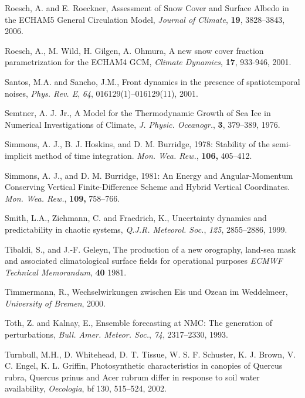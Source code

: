 \begin{thebibliography}{}
 Roesch, A. and E. Roeckner, Assessment of Snow Cover and Surface Albedo
 in the ECHAM5 General Circulation Model, {\it Journal of Climate},
 {\bf 19}, 3828--3843, 2006.

 Roesch, A., M. Wild, H. Gilgen, A. Ohmura, A new snow cover fraction
 parametrization for the ECHAM4 GCM,
 {\it Climate Dynamics}, {\bf 17}, 933-946, 2001.   

 Santos, M.A. and Sancho,
 J.M., Front dynamics in the presence of spatiotemporal noises,
 {\em Phys. Rev. E}, {\em 64}, 016129(1)--016129(11), 2001.

 Semtner, A. J. Jr.,
 A Model for the Thermodynamic Growth of Sea Ice in Numerical
 Investigations of Climate,
 {\em J. Physic. Oceanogr.}, {\bf 3}, 379--389, 1976.

 Simmons, A. J., B. J. Hoskins, and D. M. Burridge, 1978:
 Stability of the semi-implicit method of time integration.
 {\em Mon. Wea. Rew.}, {\bf 106,} 405--412.

 Simmons, A. J., and D. M. Burridge, 1981:
 An Energy and Angular-Momentum Conserving Vertical Finite-Difference
 Scheme and Hybrid Vertical Coordinates.
 {\em Mon. Wea. Rew.}, {\bf 109,} 758--766.

 Smith, L.A.,  Ziehmann, C. and  Fraedrich, K., Uncertainty
 dynamics and predictability in chaotic systems, {\em Q.J.R.
 Meteorol. Soc.}, {\em 125}, 2855--2886, 1999.

 Tibaldi, S., and J.-F. Geleyn, 
 The production of a new orography, land-sea mask and associated climatological surface
 fields for operational purposes
 {\em ECMWF Technical Memorandum}, {\bf  40} 1981.

 Timmermann, R.,
 Wechselwirkungen zwischen Eis und Ozean im Weddelmeer,
 {\em University of Bremen}, 2000.

 Toth, Z. and Kalnay, E.,
 Ensemble forecasting at NMC: The generation of perturbations, {\em
 Bull. Amer. Meteor. Soc.}, {\em 74}, 2317--2330, 1993.

 Turnbull, M.H., D. Whitehead, D. T. Tissue, W. S. F. Schuster,
 K. J. Brown, V. C. Engel, K. L. Griffin, Photosynthetic
 characteristics in canopies of Quercus rubra, Quercus prinus
 and Acer rubrum differ in response to soil water availability,
 {\it Oecologia}, {bf 130}, 515--524, 2002. 


\end{thebibliography}

